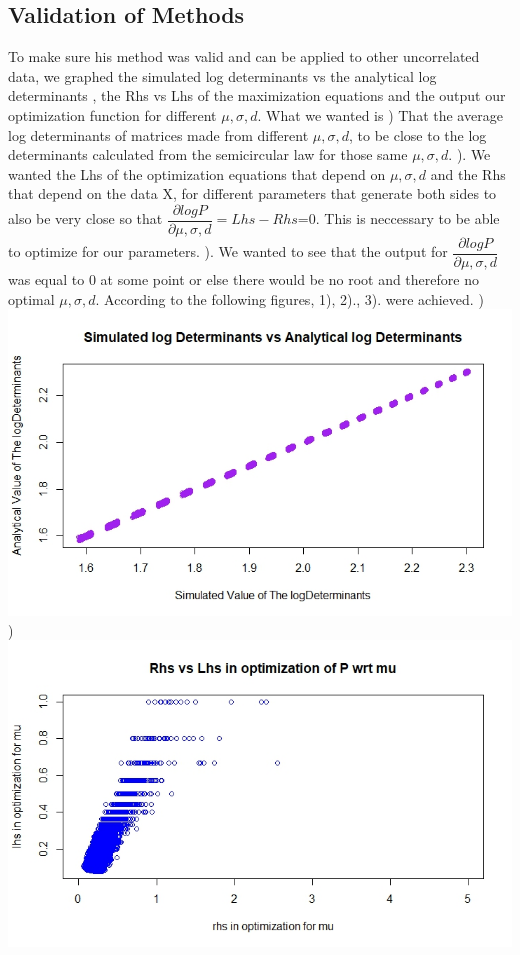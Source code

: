 \documentclass{article}
\begin{document}
\subsection{Validation of Methods}
To make sure his method was valid and can be applied to other uncorrelated data, we graphed the simulated log determinants vs the analytical log determinants , the Rhs vs Lhs of the maximization equations and the output our optimization function for different $\mu,\sigma,d$. What we wanted is \hfill\break\hfill{}) That the average log determinants of matrices made from different $\mu,\sigma,d$, to be close to the log determinants calculated from the semicircular law for those same $\mu,\sigma,d$. \hfill\break\hfill{}). We wanted the Lhs of the optimization equations that depend on $\mu,\sigma,d$ and the Rhs that depend on the data X, for different parameters that generate both sides to also be very close so that 
$\dfrac{\partial logP}{\partial \mu,\sigma,d}=Lhs-Rhs$=0. This is neccessary to be able to optimize for our parameters. \hfill\break\hfill{}). We wanted to see that the output for $\dfrac{\partial logP}{\partial\mu,\sigma,d}$ was equal to 0 at some point or else there would be no root and therefore no optimal $\mu,\sigma,d$. \hfill\break\hfill\break According to the following figures, 1), 2)., 3). were achieved.
\hfill\break
\hfill{})\hfill\break
\includegraphics[scale=0.4]{LD}\hfill{})\hfill\break
\includegraphics[scale=0.4]{rlmu}
\end{document}
